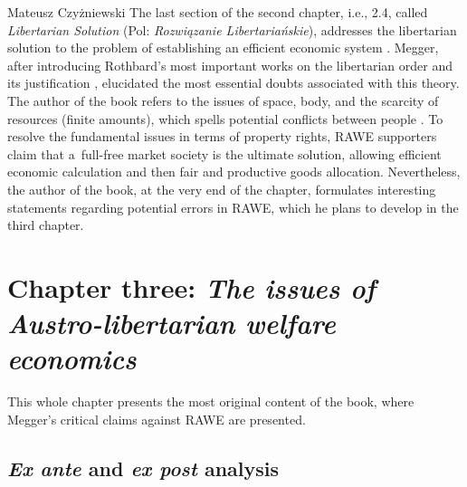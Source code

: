 \begin{newrevengenv}{Mateusz Czyżniewski}
The last section of the second chapter, i.e., 2.4, called \textit{Libertarian Solution} (Pol: \textit{Rozwiązanie Libertariańskie}), addresses the libertarian solution to the problem of establishing an efficient economic system 
\parencite[][pp.48–49]{megger_sprawiedliwosc_2021}. %
 Megger, after introducing Rothbard's most important works on the libertarian order and its justification 
\parencites[][]{rothbard_ethics_1998}[][]{rothbard_toward_2008}, %
 elucidated the most essential doubts associated with this theory. The author of the book refers to the issues of space, body, and the scarcity of resources (finite amounts), which spells potential conflicts between people 
\parencites[][]{gordon_toward_1993}[][]{herbener_pareto_1997}[][pp.311–330]{hoppe_economics_2006}[][]{wisniewski_austrian_2019}. %
 To resolve the fundamental issues in terms of property rights, RAWE supporters claim that a~full-free market society is the ultimate solution, allowing efficient economic calculation and then fair and productive goods allocation. Nevertheless, the author of the book, at the very end of the chapter, formulates interesting statements regarding potential errors in RAWE, which he plans to develop in the third chapter.



\section{Chapter three: \textit{The issues of Austro-libertarian welfare economics}}

This whole chapter 
\parencite[][pp.59–102]{megger_sprawiedliwosc_2021} %
 presents the most original content of the book, where Megger's critical claims against RAWE are presented.



\subsection{\textit{Ex ante} and \textit{ex post} analysis}




\end{newrevengenv}
